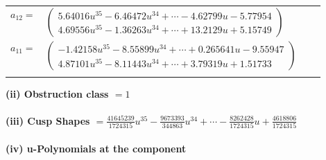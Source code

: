 \documentclass[1p]{elsarticle_modified}
\theoremstyle{definition}
\begin{document}
\begin{tabular}{m{7pt} m{180pt} m{7pt} m{180pt} }
\flushright $a_{12}=$&$\begin{pmatrix}5.64016 u^{35}-6.46472 u^{34}+\cdots-4.62799 u-5.77954\\4.69556 u^{35}-1.36263 u^{34}+\cdots+13.2129 u+5.15749\end{pmatrix}$ \\
\flushright $a_{11}=$&$\begin{pmatrix}-1.42158 u^{35}-8.55899 u^{34}+\cdots+0.265641 u-9.55947\\4.87101 u^{35}-8.11443 u^{34}+\cdots+3.79319 u+1.51733\end{pmatrix}$\\&\end{tabular}
\flushleft \textbf{(ii) Obstruction class $= 1$}\\~\\
\flushleft \textbf{(iii) Cusp Shapes $= \frac{41645239}{1724315} u^{35}-\frac{9673393}{344863} u^{34}+\cdots-\frac{8262428}{1724315} u+\frac{4618806}{1724315}$}\\~\\
\newpage\renewcommand{\arraystretch}{1}
\flushleft \textbf{(iv) u-Polynomials at the component}\newline \\
\end{document}
